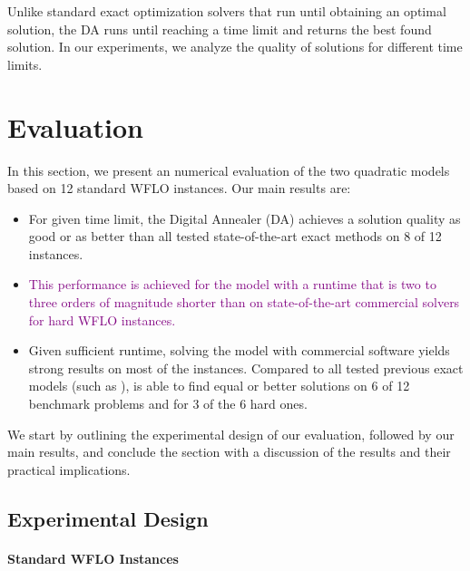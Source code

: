 \documentclass[preprint,12pt]{elsarticle}
\newcommand{\todo}[1]{{\textcolor{red}{\bf {#1}}}}
\newcommand{\qcls}{{\sf {\small QC-LS\xspace}}}
\newcommand{\quls}{{\sf {\small QU-LS\xspace}}}
\newcommand{\qcss}{{\sf {\small QC-SS\xspace}}}
\newcommand{\qcssgrb}{{\sf {\small QC-SS(GRB)\xspace}}}
\begin{document}
Unlike %
standard exact optimization solvers that run until obtaining an optimal solution, the DA runs until reaching a time limit and returns the best found solution.  In our experiments, we analyze the quality of solutions for different time limits.



\section{Evaluation}
\label{sec:eval}

In this section, we 
present an numerical evaluation of the two quadratic models based on 
12 standard WFLO instances.
Our main results are: \begin{itemize}
	\item For given time limit, the Digital Annealer (DA) achieves a solution quality as good or as better than all tested state-of-the-art exact methods on 8 of 12 instances.
	\item \textcolor{purple}{This performance is achieved for the \quls{} model with a runtime that is two to three orders of magnitude shorter than \qcls{} on state-of-the-art commercial solvers for hard WFLO instances.}
	\item Given sufficient runtime, solving the \qcls{} model with commercial software yields strong results on most of the instances. Compared to all tested previous exact models (such as \qcss), \qcls{} is able to find equal or better solutions on 6 of 12 benchmark problems and for 3 of the 6 hard ones. %
\end{itemize}

We start by outlining the experimental design of our evaluation, followed by our main results,
and conclude the section with a discussion of the results and their practical implications.

\subsection{Experimental Design}



\paragraph{Standard WFLO Instances}
\end{document}
